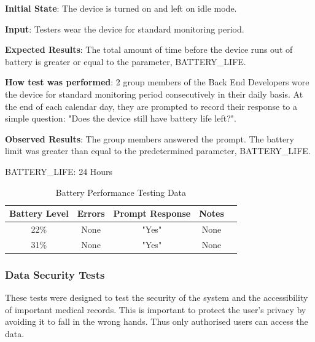 \documentclass[12pt, titlepage]{article}
\begin{document}
\begin{enumerate}
  \textbf{Initial State}: The device is turned on and left on idle mode.

  \textbf{Input}: Testers wear the device for standard monitoring period.

  \textbf{Expected Results}: The total amount of time before the device runs out of battery is greater or equal to the parameter, BATTERY\_LIFE.

  \textbf{How test was performed}: 2 group members of the Back End Developers wore the device for standard monitoring period consecutively in their daily basis. At the end of each calendar day, they are prompted to record their response to a simple question: "Does the device still have battery life left?".

  \textbf{Observed Results}: The group members answered the prompt. The battery limit was greater than equal to the predetermined parameter, BATTERY\_LIFE.

BATTERY\_LIFE: 24 Hours

\begin{table}[H]
\centering
  \begin{tabular}{| c | c | c | c | c |}
\hline
    \textbf{Battery Level} & \textbf{Errors} & \textbf{Prompt Response} & \textbf{Notes }\\
\hline
22\% & None & "Yes" & None \\
\hline
31\% & None & "Yes" & None \\
\hline
  \end{tabular}
\caption{Battery Performance Testing Data}
\end{table}


\end{enumerate}

\subsubsection{Data Security Tests}

These tests were designed to test the security of the system and the accessibility of important medical records. This is important to protect the user's privacy by avoiding it to fall in the wrong hands. Thus only authorised users can access the data.
\end{document}
